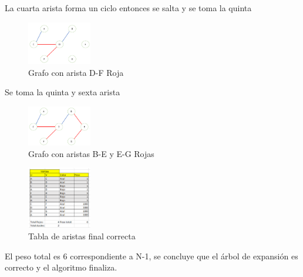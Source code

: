 \documentclass[conference,compsoc]{IEEEtran}
\begin{document}
La cuarta arista forma un ciclo entonces se salta y se toma la quinta

\begin{figure}[h] 
    \centering
    \includegraphics[width=0.25\textwidth]{Problema2/s16.png}
    \caption{Grafo con arista D-F Roja}
    \label{fig:mesh1}
\end{figure}
$$$$
Se toma la quinta y sexta arista
\begin{figure}[h] 
    \centering
    \includegraphics[width=0.25\textwidth]{Problema2/s17.png}
    \caption{Grafo con aristas B-E y E-G Rojas}
    \label{fig:mesh1}
\end{figure}
\begin{figure}[h] 
    \centering
    \includegraphics[width=0.25\textwidth]{Problema2/s18.png}
    \caption{Tabla de aristas final correcta}
    \label{fig:mesh1}
\end{figure}

El peso total es 6 correspondiente a N-1, se concluye que el árbol de expansión es correcto y el algoritmo finaliza.
\end{document}
